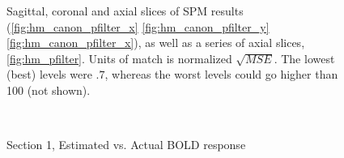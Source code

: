 \begin{figure}[H]
\caption{Sagittal, coronal and axial slices of SPM results (\autoref{fig:hm_canon_pfilter_x} \autoref{fig:hm_canon_pfilter_y} 
         \autoref{fig:hm_canon_pfilter_x}), as well as a series of axial slices, \autoref{fig:hm_pfilter}. 
         Units of match is normalized $\sqrt{MSE}$. The lowest (best) levels were $.7$,
         whereas the worst levels could go higher than 100 (not shown).}
\label{fig:hm_canon_pfilter85}
\end{figure}

\begin{figure}
\\
\caption{Section 1, Estimated vs. Actual BOLD response}
\label{fig:comp1}
\end{figure}


